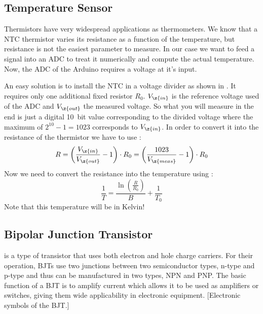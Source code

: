 \subsection{Temperature Sensor}
Thermistors have very widespread applications as thermometers. We know that a NTC thermistor varies its resistance as a function of the temperature, but resistance is not the easiest parameter to measure. In our case we want to  feed a signal into an \ac{ADC} to treat it numerically and compute the actual temperature. Now, the \ac{ADC} of the Arduino requires a voltage at it's input.\par
An easy solution is to install the \ac{NTC} in a voltage divider as shown in . It requires only one additional fixed resistor $R_{0}$. $V_{\z{in}}$ is the reference voltage used of the \ac{ADC} and $V_{\z{out}}$ the measured voltage. So what you will measure in the end is just a digital \SI{10}{bit} value corresponding to the divided voltage where the maximum of $2^{10} - 1= 1023$ corresponds to $V_{\z{in}}$. In order to convert it into the resistance of the thermistor we have to use :
\begin{equation}
	R = \left(\frac{V_{\z{in}}}{V_{\z{out}}} - 1\right)\cdot R_{0} = \left(\frac{1023}{V_{\z{meas}}} - 1\right)\cdot R_{0}
\end{equation}
Now we need to convert the resistance into the temperature using :
\begin{equation}
	\frac{1}{T} = \frac{\ln\left(\frac{R}{R_{0}}\right)}{B} + \frac{1}{T_{0}} 
\end{equation}
Note that this temperature will be in Kelvin!

\subsection{Bipolar Junction Transistor}\label{sec:trans}
 is a type of transistor that uses both electron and hole charge carriers. For their operation, \acp{BJT} use two junctions between two semiconductor types, n-type and p-type and thus can be manufactured in two types, NPN and PNP. The basic function of a \ac{BJT} is to amplify current which allows it to be used as amplifiers or switches, giving them wide applicability in electronic equipment.
[Electronic symbols of the \ac{BJT}.]

